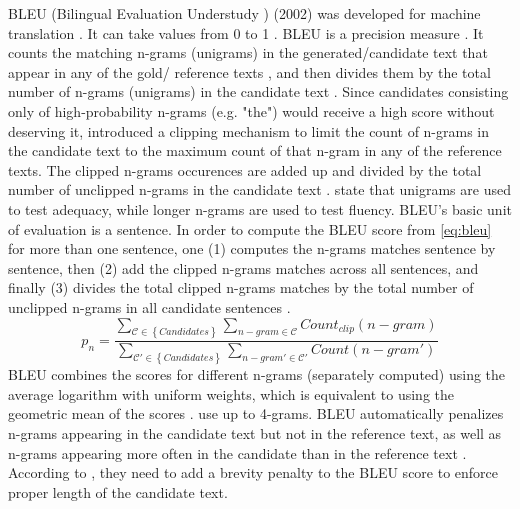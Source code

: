 BLEU (Bilingual Evaluation Understudy \citep{palivela_optimization_2021,zhou_paraphrase_2025,papineni_bleu_2001}) (2002) 
was developed for machine translation \citep{zhou_paraphrase_2021,papineni_bleu_2001}.
It can take values from 0 to 1 \citep{papineni_bleu_2001}.
BLEU is a precision measure \citep{kurt_pehlivanoglu_comparative_2024,papineni_bleu_2001}.
It counts the matching n-grams (unigrams) in the generated/candidate text that appear in any of the gold/ reference texts \citep{palivela_optimization_2021,papineni_bleu_2001}, 
and then divides them by the total number of n-grams (unigrams) in the candidate text \citep{papineni_bleu_2001}.
Since candidates consisting only of high-probability n-grams (e.g. "the") would receive a high score without deserving it, 
\citet{papineni_bleu_2001} introduced a clipping mechanism to limit the count of n-grams in the candidate text to the maximum count of that n-gram in any of the reference texts.
The clipped n-grams occurences are added up and divided by the total number of unclipped n-grams in the candidate text \citep{papineni_bleu_2001}.
\citet{papineni_bleu_2001} state that unigrams are used to test adequacy, while longer n-grams are used to test fluency.
BLEU's basic unit of evaluation is a sentence. 
In order to compute the BLEU score from \autoref{eq:bleu} for more than one sentence, one (1) computes the n-grams matches sentence by sentence, 
then (2) add the clipped n-grams matches across all sentences, 
and finally (3) divides the total clipped n-grams matches by the total number of unclipped n-grams in all candidate sentences \citep{papineni_bleu_2001}.
\begin{equation}
    p_n = \frac{\sum_{\mathcal{C} \in \left\{ Candidates \right\}}\sum_{n-gram \in\mathcal{C}}Count_{clip}(n-gram)}{\sum_{\mathcal{C'} \in \left\{ Candidates \right\}}\sum_{n-gram' \in\mathcal{C'}}Count(n-gram')}
\label{eq:bleu}
\end{equation}
BLEU combines the scores for different n-grams (separately computed) using the average logarithm with uniform weights, 
which is equivalent to using the geometric mean of the scores \citep{papineni_bleu_2001,banerjee_METEOR_2005}.
\citet{gohsen_captions_2023} use up to 4-grams.
BLEU automatically penalizes n-grams appearing in the candidate text but not in the reference text, as well as n-grams appearing more often in the candidate than in the reference text \citep{papineni_bleu_2001}.
According to \citet{papineni_bleu_2001}, they need to add a brevity penalty to the BLEU score to enforce proper length of the candidate text. 
